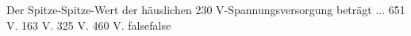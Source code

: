     {Der Spitze-Spitze-Wert der häuslichen 230 V-Spannungsversorgung beträgt ...}
    {651 V.}
    {163 V.}
    {325 V.}
    {460 V.}
    {false}{false}